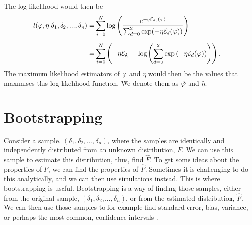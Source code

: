 The log likelihood would then be
\begin{equation*}
    \begin{aligned}
        l(\varphi,\eta|\delta_1,\delta_2,...,\delta_n) =& \sum_{i=0}^N \text{log}\left( \frac{e^{-\eta \mathcal{E}_{\delta_{i}}(\varphi)}}
        {\sum_{d=0}^{2} \text{exp}(-\eta \mathcal{E}_{d}(\varphi))}\right) \\[6pt]
        =& \sum_{i=0}^N \left(
        -\eta \mathcal{E}_{\delta_{i}} 
        - \text{log} \left( \sum_{d=0}^{2} \text{exp} \left(-\eta \mathcal{E}_{d}(\varphi)\right) \right) \right).
    \end{aligned}
\end{equation*}
The maximum likelihood estimators of $\varphi$ and $\eta$ would then be the values that maximises this log likelihood function. We denote them as $\hat{\varphi}$ and $\hat{\eta}$.




\section{Bootstrapping}
\label{section_theory_bootstrap}
Consider a sample, $(\delta_1,\delta_2,...,\delta_n)$, where the samples are identically and independently distributed from an unknown distribution, $F$. We can use this sample to estimate this distribution, thus, find $\hat{F}$. To get some ideas about the properties of $F$, we can find the properties of $\hat{F}$. Sometimes it is challenging to do this analytically, and we can then use simulations instead. This is where bootstrapping is useful. Bootstrapping is a way of finding those samples, either from the original sample, $(\delta_1,\delta_2,...,\delta_n)$, or from the estimated distribution, $\hat{F}$. We can then use those samples to for example find standard error, bias, variance, or perhaps the most common, confidence intervals \citep{bootstrap}.





